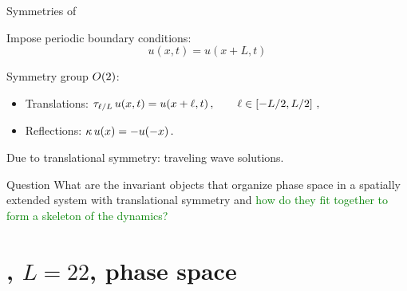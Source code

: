 \documentclass{beamer}
\begin{document}
\begin{frame}{Symmetries of \KSe}

Impose periodic boundary conditions:
\[
 u(x,t) = u(x+L,t)
\]

Symmetry group $O(2)$:
\begin{itemize}
 \item Translations: $\tau_{\ell/L}\, u(x,t) = u(x+\ell,t)\,,\qquad \ell\in\left[-L/2,L/2\right]\,,$
 \item Reflections:  $\kappa \, u(x) = -u(-x)\,.$
\end{itemize}

Due to translational symmetry: traveling wave solutions.

\begin{block}{Question} 
What are the invariant objects that organize phase space in a spatially extended system 
with translational symmetry and \textcolor{green}{how do they fit together to form a
skeleton of the dynamics?}
\end{block}


\end{frame}




\section[KSe, $L=22$]{\KS, $L=22$, phase space }
\end{document}

